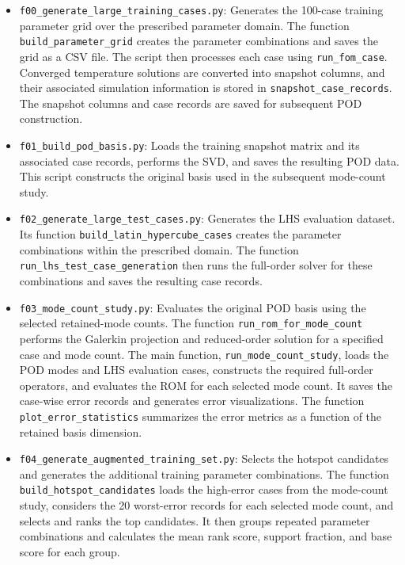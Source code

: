 \begin{itemize}

    \item \texttt{f00\_generate\_large\_training\_cases.py}:
    Generates the 100-case training parameter grid
    over the prescribed parameter domain. The
    function \texttt{build\_parameter\_grid} creates
    the parameter combinations and saves the grid
    as a CSV file. The script then processes each
    case using \texttt{run\_fom\_case}. Converged
    temperature solutions are converted into
    snapshot columns, and their associated
    simulation information is stored in
    \texttt{snapshot\_case\_records}. The snapshot
    columns and case records are saved for
    subsequent POD construction.

    \item \texttt{f01\_build\_pod\_basis.py}:
    Loads the training snapshot matrix and its
    associated case records, performs the SVD,
    and saves the resulting POD data. This script
    constructs the original basis used in the
    subsequent mode-count study.

    \item \texttt{f02\_generate\_large\_test\_cases.py}:
    Generates the LHS evaluation dataset. Its
    function \texttt{build\_latin\_hypercube\_cases}
    creates the parameter combinations within the
    prescribed domain. The function
    \texttt{run\_lhs\_test\_case\_generation}
    then runs the full-order solver for these
    combinations and saves the resulting case
    records.

    \item \texttt{f03\_mode\_count\_study.py}:
    Evaluates the original POD basis using the
    selected retained-mode counts. The function
    \texttt{run\_rom\_for\_mode\_count} performs
    the Galerkin projection and reduced-order
    solution for a specified case and mode count.
    The main function, \texttt{run\_mode\_count\_study},
    loads the POD modes and LHS evaluation cases,
    constructs the required full-order operators,
    and evaluates the ROM for each selected mode
    count. It saves the case-wise error records
    and generates error visualizations. The
    function \texttt{plot\_error\_statistics}
    summarizes the error metrics as a function
    of the retained basis dimension.

    \item \texttt{f04\_generate\_augmented\_training\_set.py}:
    Selects the hotspot candidates and generates
    the additional training parameter combinations.
    The function \texttt{build\_hotspot\_candidates}
    loads the high-error cases from the mode-count
    study, considers the 20 worst-error records
    for each selected mode count, and selects and
    ranks the top candidates. It then groups
    repeated parameter combinations and calculates
    the mean rank score, support fraction, and
    base score for each group.


\end{itemize}
